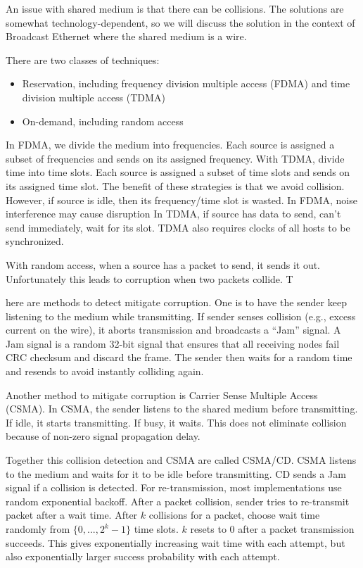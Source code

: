An issue with shared medium is that there can be collisions.
The solutions are somewhat technology-dependent, so
we will discuss the solution in the context of
Broadcast Ethernet where the shared medium is a wire.

There are two classes of techniques:
\begin{itemize}
    \item Reservation, including frequency division multiple access (FDMA) and
          time division multiple access (TDMA)
    \item On-demand, including random access
\end{itemize}

In FDMA, we divide the medium into frequencies.
Each source is assigned a subset of frequencies and
sends on its assigned frequency. With TDMA, divide time
into time slots. Each source is assigned a subset of time slots and
sends on its assigned time slot. The benefit of these
strategies is that we avoid collision.
However, if source is idle, then its frequency/time slot is wasted.
In FDMA, noise interference may cause disruption
In TDMA, if source has data to send, can't send immediately,
wait for its slot. TDMA also requires clocks of all hosts to be
synchronized.

With random access, when a source has a packet to send,
it sends it out. Unfortunately this leads to corruption
when two packets collide. T

here are methods to detect mitigate
corruption. One is to have the sender keep listening to
the medium while transmitting. If sender senses collision
(e.g., excess current on the wire), it aborts transmission
and broadcasts a “Jam” signal. A Jam signal is a random
32-bit signal that ensures that all receiving nodes fail
CRC checksum and discard the frame. The sender then
waits for a random time and resends to avoid instantly
colliding again.

Another method to mitigate corruption is
Carrier Sense Multiple Access (CSMA). In CSMA, the sender
listens to the shared medium before transmitting.
If idle, it starts transmitting. If busy, it waits.
This does not eliminate collision because of non-zero
signal propagation delay.

Together this collision detection and CSMA are called CSMA/CD.
CSMA listens to the medium and waits for it to be idle before
transmitting. CD sends a Jam signal if a collision is detected.
For re-transmission, most implementations use random
exponential backoff.
After a packet collision, sender tries to re-transmit
packet after a wait time. After $k$ collisions for a packet,
choose wait time randomly from $\{0,...,2^k - 1\}$ time slots.
$k$ resets to 0 after a packet transmission succeeds. This
gives exponentially increasing wait time with each attempt, but
also exponentially larger success probability with each attempt.

